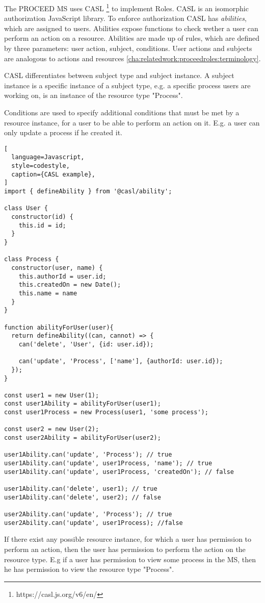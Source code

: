 The PROCEED MS uses CASL \footnote{https://casl.js.org/v6/en/} to implement Roles. 
CASL is an isomorphic authorization JavaScript library.
To enforce authorization CASL has \textit{abilities}, which are assigned to users.
Abilities expose functions to check wether a user can perform an action on a resource.
Abilities are made up of rules, which are defined by three parameters: user action, subject,
conditions.
User actions and subjects are analogous to actions and resources \ref{cha:relatedwork:proceedroles:terminology}.

CASL differentiates between subject type and subject instance.
A subject instance is a specific instance of a subject type, e.g. a specific process
users are working on, is an instance of the resource type "Process".


Conditions are used to specify additional conditions that must be met by a resource
instance, for a user to be able to perform an action on it. E.g. a user can only update a
process if he created it.

\begin{lstlisting}[
  language=Javascript,
  style=codestyle,
  caption={CASL example},
]
import { defineAbility } from '@casl/ability';

class User {
  constructor(id) {
    this.id = id;
  }
}

class Process {
  constructor(user, name) {
    this.authorId = user.id;
    this.createdOn = new Date();
    this.name = name
  }
}

function abilityForUser(user){
  return defineAbility((can, cannot) => {
    can('delete', 'User', {id: user.id});

    can('update', 'Process', ['name'], {authorId: user.id});
  });
}

const user1 = new User(1);
const user1Ability = abilityForUser(user1);
const user1Process = new Process(user1, 'some process');

const user2 = new User(2);
const user2Ability = abilityForUser(user2);

user1Ability.can('update', 'Process'); // true
user1Ability.can('update', user1Process, 'name'); // true
user1Ability.can('update', user1Process, 'createdOn'); // false

user1Ability.can('delete', user1); // true
user1Ability.can('delete', user2); // false

user2Ability.can('update', 'Process'); // true
user2Ability.can('update', user1Process); //false
\end{lstlisting}

If there exist any possible resource instance, for which a user has permission to perform an action,
then the user has permission to perform the action on the resource type.
E.g if a user has permission to view some process in the MS, then he has permission to
view the resource type "Process".

